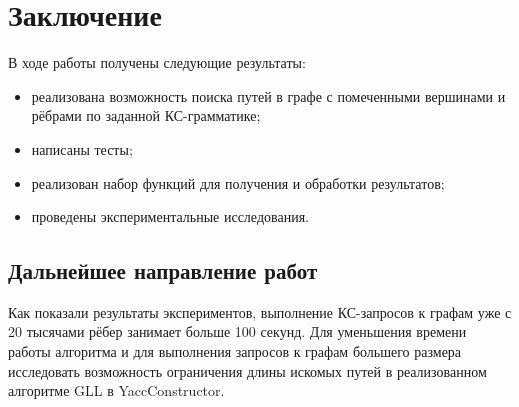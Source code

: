 \documentclass[14pt]{matmex-diploma}
\begin{document}
\section{Заключение}
В ходе работы получены следующие результаты:
\begin{itemize}
    \item реализована возможность поиска путей в графе с помеченными вершинами и рёбрами по заданной КС-грамматике;
    \item написаны тесты;
    \item реализован набор функций для получения и обработки результатов;
    \item проведены экспериментальные исследования.
\end{itemize}

\subsection{Дальнейшее направление работ}

Как показали результаты экспериментов, выполнение КС-запросов к графам уже с 20 тысячами рёбер занимает больше 100 секунд. Для уменьшения времени работы алгоритма и для выполнения запросов к графам большего размера исследовать возможность ограничения длины искомых путей в реализованном алгоритме GLL в YaccConstructor.

\setmonofont[Mapping=tex-text]{CMU Typewriter Text}


\end{document}
